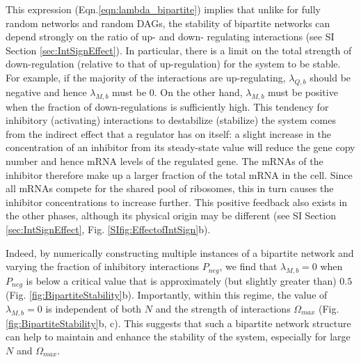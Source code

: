 \documentclass[10pt]{article}
\begin{document}
This expression (Eqn.\ref{eqn:lambda_bipartite}) implies that unlike for fully random networks and random DAGs, the stability of bipartite networks can depend strongly on the ratio of up- and down- regulating interactions (see SI Section \ref{sec:IntSignEffect}). In particular, there is a limit on the total strength of down-regulation (relative to that of up-regulation) for the system to be stable. For example, if the majority of the interactions are up-regulating, $\lambda_{Q,b}$ should be negative and hence $\lambda_{M,b}$ must be $0$. On the other hand, $\lambda_{M,b}$ must be positive when the fraction of down-regulations is sufficiently high. This tendency for inhibitory (activating) interactions to destabilize (stabilize) the system comes from the indirect effect that a regulator has on itself: a slight increase in the concentration of an inhibitor from its steady-state value will reduce the gene copy number and hence mRNA levels of the regulated gene. The mRNAs of the inhibitor therefore make up a larger fraction of the total mRNA in the cell. Since all mRNAs compete for the shared pool of ribosomes, this in turn causes the inhibitor concentrations to increase further. This positive feedback also exists in the other phases, although its physical origin may be different (see SI Section \ref{sec:IntSignEffect}, Fig. \ref{SIfig:EffectofIntSign}b). 

Indeed, by numerically constructing multiple instances of a bipartite network and varying the fraction of inhibitory interactions $P_{neg}$, we find that $\lambda_{M,b} = 0$ when $P_{neg}$ is below a critical value that is approximately (but slightly greater than) $0.5$ (Fig. \ref{fig:BipartiteStability}b). Importantly, within this regime, the value of $\lambda_{M,b}=0$ is independent of both $N$ and the strength of interactions $\Omega_{max}$ (Fig. \ref{fig:BipartiteStability}b, c). This suggests that such a bipartite network structure can help to maintain and enhance the stability of the system, especially for large $N$ and $\Omega_{max}$. 
\end{document}
